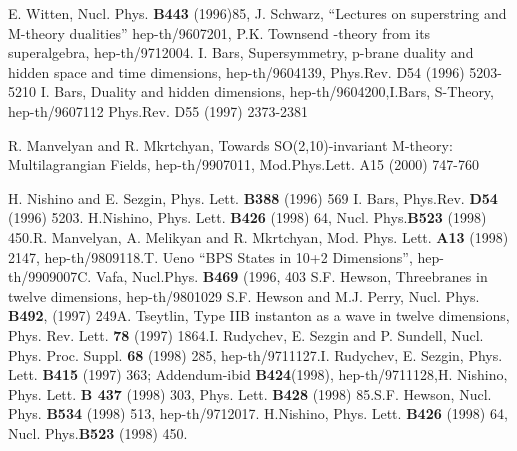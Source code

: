 \documentclass[a4paper,12pt]{article}
\begin{document}
\begin{thebibliography}{99}
  E. Witten, Nucl. Phys. \textbf{B443} (1996)85,\newline
J. Schwarz, ``Lectures on superstring and M-theory dualities''
hep-th/9607201,\newline
 P.K. Townsend \coordHE{}-theory from its superalgebra,
hep-th/9712004.
 I. Bars, Supersymmetry, p-brane duality and hidden space
and time dimensions, hep-th/9604139, Phys.Rev. D54 (1996)
5203-5210 \newline I. Bars, Duality and hidden dimensions,
hep-th/9604200,\newline I.Bars, S-Theory, hep-th/9607112 Phys.Rev.
D55 (1997) 2373-2381

  R. Manvelyan and R. Mkrtchyan, Towards SO(2,10)-invariant
M-theory: Multilagrangian Fields, hep-th/9907011, Mod.Phys.Lett.
A15 (2000) 747-760

  H. Nishino and E. Sezgin, Phys. Lett. \textbf{B388} (1996)
569 \newline I. Bars, Phys.Rev. \textbf{D54} (1996) 5203. \newline
H.Nishino, Phys. Lett. \textbf{B426} (1998) 64, Nucl.
Phys.\textbf{B523} (1998) 450.\newline R. Manvelyan, A. Melikyan
and R. Mkrtchyan, Mod. Phys. Lett. \textbf{A13} (1998) 2147,
hep-th/9809118.\newline T. Ueno ``BPS States in 10+2 Dimensions'',
hep-th/9909007\newline C. Vafa, Nucl.Phys. \textbf{B469} (1996,
403 \newline S.F. Hewson, Threebranes in twelve dimensions,
hep-th/9801029
\newline S.F. Hewson and M.J. Perry, Nucl. Phys. \textbf{B492},
(1997) 249\newline A. Tseytlin, Type IIB instanton as a wave in
twelve dimensions, Phys. Rev. Lett. \textbf{78} (1997)
1864.\newline I. Rudychev, E. Sezgin and P. Sundell, Nucl. Phys.
Proc. Suppl. \textbf{68} (1998) 285, hep-th/9711127.\newline I.
Rudychev, E. Sezgin, Phys. Lett. \textbf{B415} (1997) 363;
Addendum-ibid \textbf{B424}(1998), hep-th/9711128,\newline H.
Nishino, Phys. Lett. \textbf{B 437} (1998) 303, Phys. Lett.
\textbf{B428} (1998) 85.\newline S.F. Hewson, Nucl. Phys.
\textbf{B534} (1998) 513, hep-th/9712017.
\newline H.Nishino, Phys. Lett. \textbf{B426} (1998) 64, Nucl. Phys.\textbf{B523}
(1998) 450.


\end{thebibliography}
\end{document}
